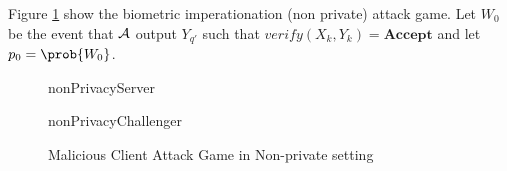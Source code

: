 \begin{description}
\begin{description}
    Figure \ref{fig:maliciousNonPrivate} show the biometric
    imperationation (non private) attack game. Let $W_{0}$ be the event that
    $\mathcal{A}$ output $Y_{q'}$ such that
    $verify(X_{k},Y_{k}) = \mathbf{Accept}$ and let $p_{0} = \prob{W_{0}} $.
    \begin{figure}[!h]
      \begin{center}
        \begin{bbrenv}{nonPrivacyServer}
          \begin{bbrbox}[name=Adversary, minheight=2cm]
          \end{bbrbox}
          \begin{bbrchallenger}{nonPrivacyChallenger}
            \begin{bbrbox}[name=Challenger]
            \end{bbrbox}
          \end{bbrchallenger}
        \end{bbrenv}
      \end{center}
      \caption{Malicious Client Attack Game in Non-private setting}
      \label{fig:maliciousNonPrivate}
    \end{figure}

    


\end{description}
\end{description}
